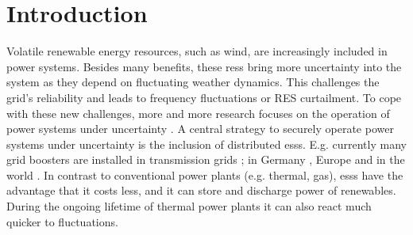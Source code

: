 \documentclass[final,3p,times,twocolumn]{elsarticle}  %
\newcommand{\todo}[1]{\textcolor{orange}{[#1]}}
\begin{document}
\linenumbers


\section{Introduction}

\glsresetall

Volatile renewable energy resources, such as wind, are increasingly included in power systems. Besides many benefits, these \glspl{res} bring more uncertainty into the system as they depend on fluctuating weather dynamics. This challenges the grid's reliability and leads to frequency fluctuations or RES curtailment. To cope with these new challenges, more and more research focuses on the operation of power systems under uncertainty \cite{Capitanescu12,Vrakopoulou17,Roald18,Guo18,Li17,Warrington13}. 
A central strategy to securely operate power systems under uncertainty is the inclusion of distributed \glspl{ess}. E.g. currently many grid boosters are installed in transmission grids \cite{molina_distributed_2012}; in Germany \cite{figgener_development_2021}, Europe \cite{zsiboracs_intermittent_2019} and in the world \cite{gulagi_role_2018, keck_impact_2019}. 
In contrast to conventional power plants (e.g. thermal, gas), \glspl{ess} have the advantage that it costs less, and it can store and discharge power of renewables. During the ongoing lifetime of thermal power plants it can also react much quicker to fluctuations. 

\end{document}
